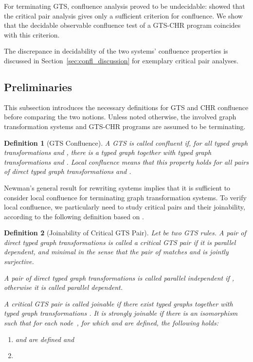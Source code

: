 \documentclass{tlp}
\newtheorem{definition}{Definition}[section]
\begin{document}
For terminating GTS, confluence analysis proved to be undecidable: \cite{plump05}
showed that the critical pair analysis gives only a sufficient criterion for
confluence. We show that the decidable observable confluence test of a GTS-CHR
program coincides with this criterion.

The discrepance in decidability of the two systems' confluence properties is
discussed in Section~\ref{sec:confl_discussion} for exemplary critical pair
analyses.

\subsection{Preliminaries}
\label{sec:confl_gts}

This subsection introduces the necessary definitions for GTS and CHR confluence
before comparing the two notions. Unless noted otherwise, the involved graph
transformation systems and GTS-CHR programs are assumed to be terminating.

\begin{definition}[GTS Confluence]A GTS is called \emph{confluent} if, for all
typed graph transformations  and , there is a typed graph  together with
typed graph transformations  and . \emph{Local confluence} means that this
property holds for all pairs of direct typed graph transformations  and  \cite{ehrigprangetaentzer06}.
\end{definition}

Newman's general result for rewriting systems \cite{newman} implies that it is
sufficient to consider local confluence for terminating graph transformation
systems. To verify local confluence, we particularly need to study critical pairs
and their joinability, according to the following definition based on
\cite{ehrigprangetaentzer06,plump05}.

\begin{definition}[Joinability of Critical GTS Pair]\label{def:gts_cp} Let  be two GTS rules. A
pair  of direct typed graph transformations is called a
\emph{critical GTS pair} if it is parallel dependent, and minimal in the sense
that the pair  of matches  and  is jointly surjective.

A pair  of direct typed graph transformations is called
\emph{parallel independent} if , otherwise it is called \emph{parallel dependent}.

A critical GTS pair  is called \emph{joinable} if there exist typed graphs
 together with typed graph transformations .
It is \emph{strongly joinable} if there is an isomorphism~ such that for each node~, for which  and
 are defined, the following holds:
\begin{enumerate}
  \item  and  are defined and
  \item 
\end{enumerate}
\end{definition}
\end{document}
